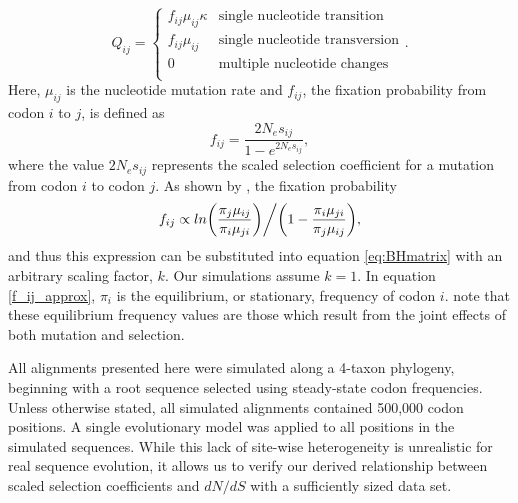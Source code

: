 \documentclass{pnastwo}
\begin{document}
\begin{article}
\begin{equation}\label{eq:HBmatrix}
	Q_{ij} = \left\{ \begin{array}{rl}
		f_{ij}\mu_{ij}\kappa               &\mbox{single nucleotide transition} \\
		f_{ij}\mu_{ij}                          &\mbox{single nucleotide transversion} \\
		0                                           &\mbox{multiple nucleotide changes} \\             
	\end{array} \right..
\end{equation} Here, $\mu_{ij}$ is the nucleotide mutation rate and $f_{ij}$, the fixation probability from codon $i$ to $j$, is defined as 
\begin{equation}\label{f_ij_approx} f_{ij} = \frac{2N_es_{ij}}{1 - e^{2N_es_{ij}}}, \end{equation} where the value $2N_es_{ij}$ represents the scaled selection coefficient for a mutation from codon $i$ to codon $j$\cite{HalpernBruno1998, YangNielsen2008}. As shown by \cite{HalpernBruno1998}, the fixation probability \begin{equation}f_{ij} \propto ln\bigg{(}\frac{\pi_j\mu_{ij}}{\pi_i\mu_{ji}}\bigg{)}\bigg{/}\bigg{(}1 - \frac{\pi_i\mu_{ji}}{\pi_j\mu_{ij}}\bigg{)},\end{equation} and thus this expression can be substituted into equation \eqref{eq:BHmatrix} with an arbitrary scaling factor, $k$. Our simulations assume $k=1$. In equation \eqref{f_ij_approx}, $\pi_i$ is the equilibrium, or stationary, frequency of codon $i$. note that these equilibrium frequency values are those which result from the joint effects of both mutation and selection. 


All alignments presented here were simulated along a 4-taxon phylogeny, beginning with a root sequence selected using steady-state codon frequencies. Unless otherwise stated, all simulated alignments contained 500,000 codon positions. A single evolutionary model was applied to all positions in the simulated sequences. While this lack of site-wise heterogeneity is unrealistic for real sequence evolution, it allows us to verify our derived relationship between scaled selection coefficients and $dN/dS$ with a sufficiently sized data set.



\end{article}
\end{document}
